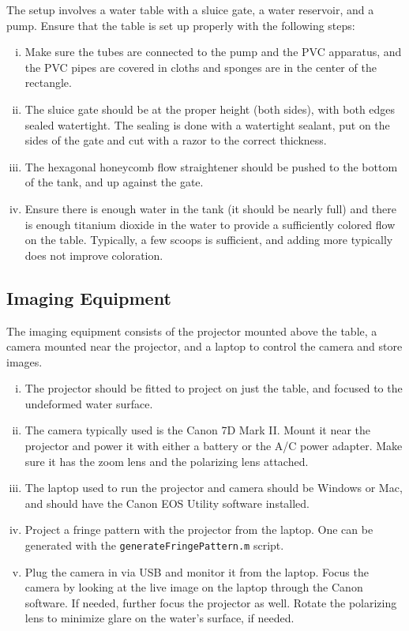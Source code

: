\documentclass[11pt]{article}
\begin{document}
The setup involves a water table with a sluice gate, a water reservoir, and a pump. Ensure that the table is set up properly with the following steps:
\begin{enumerate}[(i)]
    \item Make sure the tubes are connected to the pump and the PVC apparatus, and the PVC pipes are covered in cloths and sponges are in the center of the rectangle.

    \item The sluice gate should be at the proper height (both sides), with both edges sealed watertight. The sealing is done with a watertight sealant, put on the sides of the gate and cut with a razor to the correct thickness.

    \item The hexagonal honeycomb flow straightener should be pushed to the bottom of the tank, and up against the gate.

    \item Ensure there is enough water in the tank (it should be nearly full) and there is enough titanium dioxide in the water to provide a sufficiently colored flow on the table. Typically, a few scoops is sufficient, and adding more typically does not improve coloration.
\end{enumerate}

\subsection*{Imaging Equipment}

The imaging equipment consists of the projector mounted above the table, a camera mounted near the projector, and a laptop to control the camera and store images.

\begin{enumerate}[(i)]
    \item The projector should be fitted to project on just the table, and focused to the undeformed water surface.

    \item The camera typically used is the Canon 7D Mark II. Mount it near the projector and power it with either a battery or the A/C power adapter. Make sure it has the zoom lens and the polarizing lens attached.

    \item The laptop used to run the projector and camera should be Windows or Mac, and should have the Canon EOS Utility software installed.

    \item Project a fringe pattern with the projector from the laptop. One can be generated with the {\tt generateFringePattern.m} script.

    \item Plug the camera in via USB and monitor it from the laptop. Focus the camera by looking at the live image on the laptop through the Canon software. If needed, further focus the projector as well. Rotate the polarizing lens to minimize glare on the water's surface, if needed.
\end{enumerate}
\end{document}
